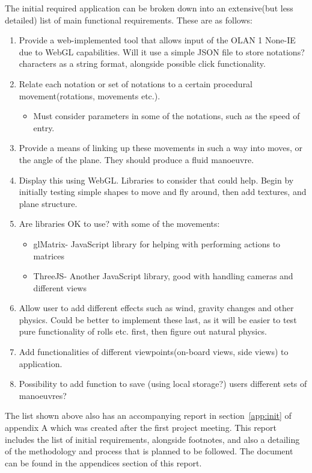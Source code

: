 \noindent The initial required application can be broken down into an extensive(but less detailed) list of main functional requirements. These are as follows:
\begin{enumerate}
	\item Provide a web-implemented tool that allows input of the OLAN 1 None-IE due to WebGL capabilities. Will it use a simple JSON file to store notations? characters as a string format, alongside possible click functionality.
	\item Relate each notation or set of notations to a certain procedural movement(rotations, movements etc.). 
		\begin{itemize}
			\item Must consider parameters in some of the notations, such as the speed of entry.
		\end{itemize}
	\item Provide a means of linking up these movements in such a way into moves, or the angle of the plane. They should produce a fluid manoeuvre.
	\item Display this using WebGL. Libraries to consider that could help. Begin by initially testing simple shapes to move and fly around, then add textures, and plane structure.
	\item Are libraries OK to use? with some of the movements:
		\begin{itemize}
			\item glMatrix- JavaScript library for helping with performing actions to matrices\cite{GlMatrix}
			\item ThreeJS- Another JavaScript library, good with handling cameras and different views\cite{ThreeJs}
		\end{itemize}
	\item Allow user to add different effects such as wind, gravity changes and other physics. Could be better to implement these last, as it will be easier to test pure functionality of rolls etc. first, then figure out natural physics.
	\item Add functionalities of different viewpoints(on-board views, side views) to application.
	\item Possibility to add function to save (using local storage?) users different sets of manoeuvres?
\end{enumerate}

The list shown above also has an accompanying report in section~\ref{app:init} of appendix A which was created after the first project meeting. This report includes the list of initial requirements, alongside footnotes, and also a detailing of the methodology and process that is planned to be followed. The document can be found in the appendices section of this report. 

